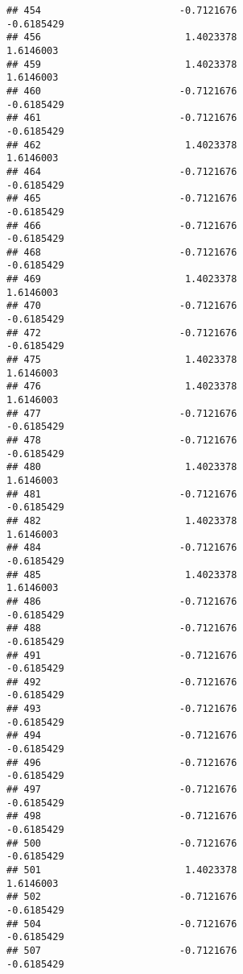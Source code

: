 \documentclass[
]{article}
\begin{document}
\begin{verbatim}
## 454                        -0.7121676                       -0.6185429
## 456                         1.4023378                        1.6146003
## 459                         1.4023378                        1.6146003
## 460                        -0.7121676                       -0.6185429
## 461                        -0.7121676                       -0.6185429
## 462                         1.4023378                        1.6146003
## 464                        -0.7121676                       -0.6185429
## 465                        -0.7121676                       -0.6185429
## 466                        -0.7121676                       -0.6185429
## 468                        -0.7121676                       -0.6185429
## 469                         1.4023378                        1.6146003
## 470                        -0.7121676                       -0.6185429
## 472                        -0.7121676                       -0.6185429
## 475                         1.4023378                        1.6146003
## 476                         1.4023378                        1.6146003
## 477                        -0.7121676                       -0.6185429
## 478                        -0.7121676                       -0.6185429
## 480                         1.4023378                        1.6146003
## 481                        -0.7121676                       -0.6185429
## 482                         1.4023378                        1.6146003
## 484                        -0.7121676                       -0.6185429
## 485                         1.4023378                        1.6146003
## 486                        -0.7121676                       -0.6185429
## 488                        -0.7121676                       -0.6185429
## 491                        -0.7121676                       -0.6185429
## 492                        -0.7121676                       -0.6185429
## 493                        -0.7121676                       -0.6185429
## 494                        -0.7121676                       -0.6185429
## 496                        -0.7121676                       -0.6185429
## 497                        -0.7121676                       -0.6185429
## 498                        -0.7121676                       -0.6185429
## 500                        -0.7121676                       -0.6185429
## 501                         1.4023378                        1.6146003
## 502                        -0.7121676                       -0.6185429
## 504                        -0.7121676                       -0.6185429
## 507                        -0.7121676                       -0.6185429

\end{verbatim}
\end{document}
